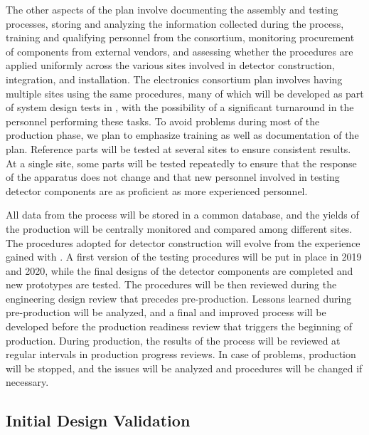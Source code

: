 The other aspects of the  plan involve documenting the 
assembly and testing processes, storing and analyzing the information
collected during the  process, training and qualifying 
personnel from the consortium, monitoring procurement of 
components from external vendors, and assessing whether the
 procedures are applied uniformly across
the various sites involved in detector construction, integration,
and installation. The  electronics consortium plan involves
having multiple sites using the same  procedures,
many of which will be developed as part of system design tests in ,
with the possibility of a significant turnaround in the personnel
performing these tasks. To avoid problems during most of the
production phase, we plan to emphasize training as well as documentation
of the  plan. Reference parts will be tested at
several sites to ensure consistent results. At
a single site, some parts will be tested repeatedly to ensure
that the response of the apparatus does not change and
that new personnel involved in testing detector components are 
as proficient as more experienced personnel. 

All data from
the  process will be stored in a common database, and
the yields of the production will be centrally monitored and 
compared among different sites. The procedures adopted
for detector construction will evolve from the experience
gained with . A first version of the testing procedures
will be put in place in 2019 and 2020, while the final designs of
the detector components are completed and new prototypes are
tested. The  procedures will be then reviewed
during the engineering design review that precedes pre-production. Lessons learned during pre-production
will be analyzed, and a final and improved  process will be 
developed before the production readiness review that triggers
the beginning of production. During production, the results
of the  process will be reviewed at regular intervals
in production progress reviews. In case of problems, production
will be stopped, and the issues will be analyzed 
and procedures will be changed if necessary.

\subsection{Initial Design Validation}
\label{sec:fdsp-tpcelec-qa-initial}

